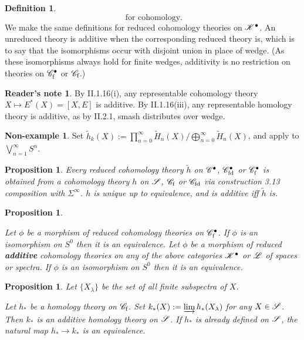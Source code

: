\documentclass[11pt]{article}
\theoremstyle{plain}
\newtheorem{prop}[thm]{Proposition}
\theoremstyle{definition}
\newtheorem{defn}[thm]{Definition}
\newtheorem*{ReadersNote}{Reader's note}
\newtheorem{nonexample}[thm]{Non-example}
\newcommand{\Specf}{\scrC_\textup{f}}
\newcommand{\Specfd}{\scrC_\textup{fd}}
\begin{document}
{\begin{defn}
\[\text{\ for cohomology}.\]
We make the same definitions for reduced \lparen co\rparen homology theories on
$\mathscr{K}^\bullet$. An unreduced theory is additive when the corresponding reduced
theory is, which is to say that the isomorphisms occur with disjoint union in
place of wedge. (As these isomorphisms always hold for finite wedges, additivity
is no restriction on theories on $\mathscr{C}_\textup{f}^\bullet$ or $\Specf$.)
\end{defn}
\begin{ReadersNote}
By II.1.16(i), any representable cohomology theory $X\mapsto E^*(X)=[X,E]$ is
additive. By II.1.16(iii), any representable homology theory is additive, as by
II.2.1, smash distributes over wedge.
\end{ReadersNote}
\begin{nonexample}
Set $\widetilde h_k(X):=\prod_{n=0}^\infty\widetilde H_n(X)
/\bigoplus_{n=0}^\infty\widetilde H_n(X)$, and apply to 
$\bigvee_{n=1}^\infty S^n$.
\end{nonexample}
\begin{prop}
Every reduced \lparen co\rparen homology theory $\widetilde h$ on
$\mathscr{C}^\bullet$, $\mathscr{C}_\textup{fd}^\bullet$ or $\mathscr{C}_\textup{f}^\bullet$ is
obtained from a \lparen co\rparen homology theory $h$ on $\mathscr{S}$, $\Specf$ or
$\Specfd$ via construction 3.13 \lparen composition with $\Sigma^\infty$\rparen.
$h$ is unique up to equivalence, and is additive iff $\widetilde h$ is.
\end{prop}
\begin{prop}\hfil
\begin{itemise}
\itm[(i)] Let $\phi$ be a morphism of reduced \lparen co\rparen homology
theories on $\mathscr{C}_\textup{f}^\bullet$. If $\phi$ is an isomorphism on $S^0$
then it is an equivalence.
\itm[(ii)] Let $\phi$ be a morphism of reduced \textbf{additive} \lparen
co\rparen homology theories on any of the above categories $\mathscr{K}^\bullet$ or
$\mathscr{L}$ of spaces or spectra. If $\phi$ is an isomorphism on $S^0$ then it is an
equivalence.
\end{itemise}
\end{prop}
\begin{prop}Let $\{X_\lambda\}$ be the set of all finite subspectra of $X$.
\begin{itemise}
\itm[(i)] Let $h_*$ be a homology theory on $\Specf$. Set $k_*(X):=\varinjlim
h_*(X_\lambda)$ for any $X\in\mathscr{S}$. Then $k_*$ is an additive homology theory
on $\mathscr{S}$.
\itm[(ii)] If $h_*$ is already defined on $\mathscr{S}$, the natural map $h_*\to k_*$
is an equivalence.

\end{itemise}
\end{prop}}
\end{document}
